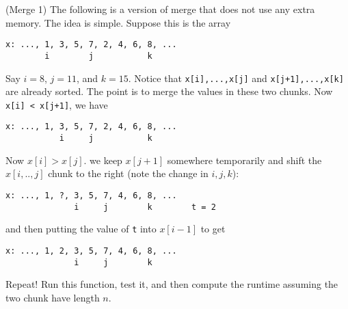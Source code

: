 \begin{ex} (Merge 1)
The following is a version of merge that does not
use any extra memory.
The idea is simple.
Suppose this is the array
\begin{Verbatim}[frame=single,fontsize=\footnotesize]
x: ..., 1, 3, 5, 7, 2, 4, 6, 8, ...
        i        j           k
\end{Verbatim}
Say $i = 8$, $j = 11$, and $k = 15$.
Notice that 
\verb!x[i],...,x[j]!
and
\verb!x[j+1],...,x[k]! 
are already sorted.
The point is to merge the values in these two chunks.
Now \verb!x[i] < x[j+1]!, we have
\begin{Verbatim}[frame=single,fontsize=\footnotesize]
x: ..., 1, 3, 5, 7, 2, 4, 6, 8, ...
           i     j           k
\end{Verbatim}
Now $x[i] > x[j]$. we keep $x[j+1]$ somewhere temporarily and shift
the $x[i,..,j]$ chunk to the right (note the change in $i,j,k$):
\begin{Verbatim}[frame=single,fontsize=\footnotesize]
x: ..., 1, ?, 3, 5, 7, 4, 6, 8, ...
              i     j        k        t = 2
\end{Verbatim}
and then putting the value of \verb!t! into $x[i-1]$ to get
\begin{Verbatim}[frame=single,fontsize=\footnotesize]
x: ..., 1, 2, 3, 5, 7, 4, 6, 8, ...
              i     j        k       
\end{Verbatim}
Repeat!
Run this function, test it, and then compute the runtime
assuming the two chunk have length $n$.
\end{ex}

